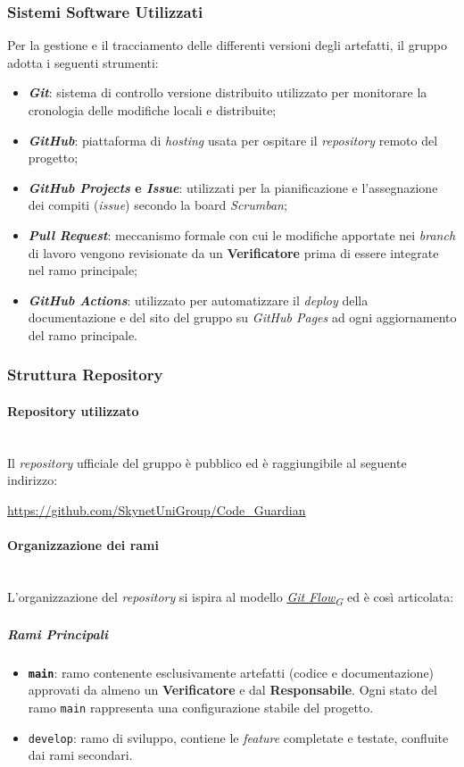 \documentclass[12pt, a4paper]{article}
\newcommand{\urlglossario}{https://skynetunigroup.github.io/Code_Guardian/Documentazione/PB/glossario_v2.0.0.pdf} %
\newcommand{\glo}[2]{\href{\urlglossario\#nameddest=#2}{#1\textsubscript{G}}}
\begin{document}
\subsubsection{Sistemi Software Utilizzati}
Per la gestione e il tracciamento delle differenti versioni degli artefatti, il gruppo adotta i seguenti strumenti:
\begin{itemize}
    \item \textbf{\textit{Git}}: sistema di controllo versione distribuito utilizzato per monitorare la cronologia delle modifiche locali e distribuite;
    \item \textbf{\textit{GitHub}}: piattaforma di \textit{hosting} usata per ospitare il \textit{repository} remoto del progetto;
    \item \textbf{\textit{GitHub Projects} e \textit{Issue}}: utilizzati per la pianificazione e l'assegnazione dei compiti (\textit{issue}) secondo la board \textit{Scrumban};
    \item \textbf{\textit{Pull Request}}: meccanismo formale con cui le modifiche apportate nei \textit{branch} di lavoro vengono revisionate da un \textbf{Verificatore} prima di essere integrate nel ramo principale;
    \item \textbf{\textit{GitHub Actions}}: utilizzato per automatizzare il \textit{deploy} della documentazione e del sito del gruppo su \textit{GitHub Pages} ad ogni aggiornamento del ramo principale.
\end{itemize}

\newpage
\subsubsection{Struttura Repository}
\paragraph{Repository utilizzato}~\\
Il \textit{repository} ufficiale del gruppo è pubblico ed è raggiungibile al seguente indirizzo:
\begin{center}
    \url{https://github.com/SkynetUniGroup/Code_Guardian}
\end{center}

\paragraph{Organizzazione dei rami}~\\
L'organizzazione del \textit{repository} si ispira al modello \textit{\glo{Git Flow}{git-flow}} ed è così articolata:
\subparagraph{Rami Principali}
\begin{itemize}
    \item \textbf{\texttt{main}}: ramo contenente esclusivamente artefatti (codice e documentazione) approvati da almeno un \textbf{Verificatore} e dal \textbf{Responsabile}. Ogni stato del ramo \texttt{main} rappresenta una configurazione stabile del progetto.
    \item \texttt{develop}: ramo di sviluppo, contiene le \textit{feature} completate e testate, confluite dai rami secondari.
\end{itemize}
\end{document}
